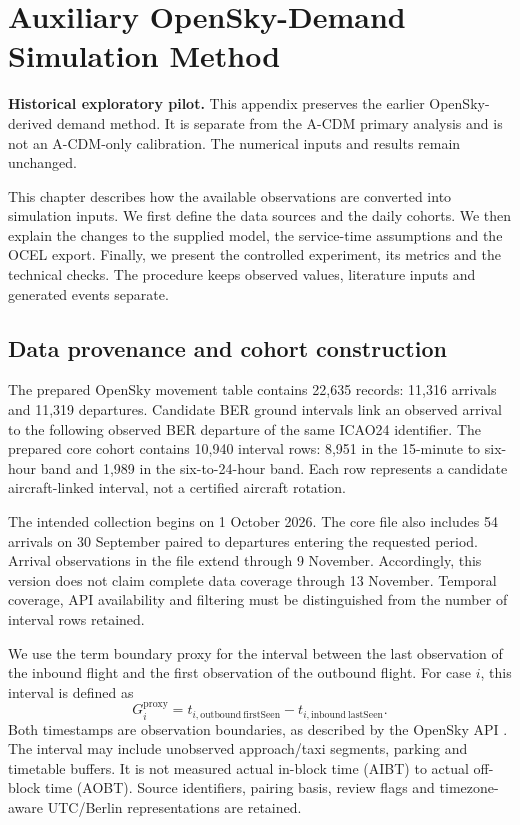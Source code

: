 \chapter{Auxiliary OpenSky-Demand Simulation Method}
\label{app:auxmethods}
\noindent\textbf{Historical exploratory pilot.} This appendix preserves the earlier OpenSky-derived demand method. It is separate from the A-CDM primary analysis and is not an A-CDM-only calibration. The numerical inputs and results remain unchanged.

This chapter describes how the available observations are converted into simulation inputs. We first define the data sources and the daily cohorts. We then explain the changes to the supplied model, the service-time assumptions and the OCEL export. Finally, we present the controlled experiment, its metrics and the technical checks. The procedure keeps observed values, literature inputs and generated events separate.

\section{Data provenance and cohort construction}
The prepared OpenSky movement table contains 22,635 records: 11,316 arrivals and 11,319 departures. Candidate BER ground intervals link an observed arrival to the following observed BER departure of the same ICAO24 identifier. The prepared core cohort contains 10,940 interval rows: 8,951 in the 15-minute to six-hour band and 1,989 in the six-to-24-hour band. Each row represents a candidate aircraft-linked interval, not a certified aircraft rotation.

The intended collection begins on 1 October 2026. The core file also includes 54 arrivals on 30 September paired to departures entering the requested period. Arrival observations in the file extend through 9 November. Accordingly, this version does not claim complete data coverage through 13 November. Temporal coverage, API availability and filtering must be distinguished from the number of interval rows retained.

We use the term boundary proxy for the interval between the last observation of the inbound flight and the first observation of the outbound flight. For case $i$, this interval is defined as
\begin{equation}
G_i^{\mathrm{proxy}}=t_{i,\mathrm{outbound\ firstSeen}}-t_{i,\mathrm{inbound\ lastSeen}}.
\end{equation}
Both timestamps are observation boundaries, as described by the OpenSky API \cite{opensky_rest}. The interval may include unobserved approach/taxi segments, parking and timetable buffers. It is not measured actual in-block time (AIBT) to actual off-block time (AOBT). Source identifiers, pairing basis, review flags and timezone-aware UTC/Berlin representations are retained.

